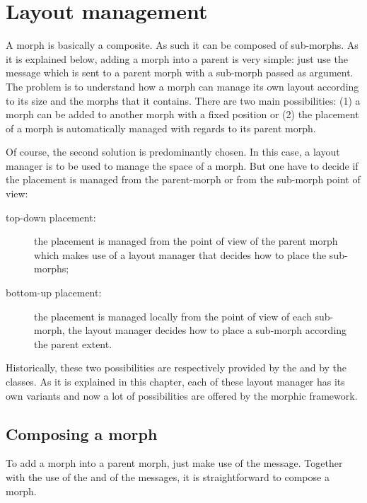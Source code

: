 \documentclass[a4paper,10pt,twoside]{book}
\begin{document}
\section{Layout management}


A morph is basically a composite. As such it can be composed of sub-morphs. As it is explained below, adding a morph into a parent is very simple: just use the  message which is sent to a parent morph with a sub-morph passed as argument. The problem is to understand how a morph can manage its own layout according to its size and the morphs that it contains. There are two main possibilities: (1) a morph can be added to another morph with a fixed position or (2) the placement of a morph is automatically managed with regards to its parent morph.

Of course, the second solution is predominantly chosen. In this case, a layout manager is to be used to manage the space of a morph. But one have to decide if the placement is managed from the parent-morph or from the sub-morph point of view:
\begin{description}
\item[top-down placement:] the placement is managed from the point of view of the parent morph which makes use of a layout manager that decides how to place the sub-morphs;
\item[bottom-up placement:] the placement is managed locally from the point of view of each sub-morph, the layout manager decides how to place a sub-morph according the parent extent.
\end{description}
Historically, these two possibilities are respectively provided by the  and by the  classes. As it is explained in this chapter, each of these layout manager has its own variants and now a lot of possibilities are offered by the morphic framework.

\subsection{Composing a morph}
To add a morph into a parent morph, just make use of the  message. Together with the use of the  and of the  messages, it is straightforward to compose a morph.
\end{document}

